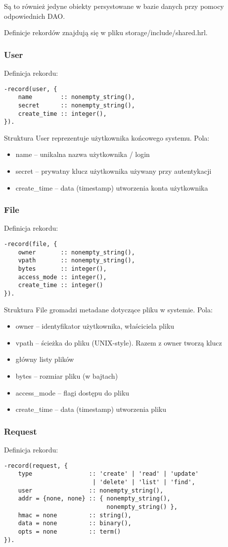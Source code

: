 Są to również jedyne obiekty persystowane w bazie danych przy pomocy odpowiednich DAO.

Definicje rekordów znajdują się w pliku storage/include/shared.hrl.

\subsubsection{User}
Definicja rekordu:
\begin{lstlisting}
-record(user, {
	name 		:: nonempty_string(), 
	secret 		:: nonempty_string(), 
	create_time :: integer(), 
}).
\end{lstlisting}

Struktura User reprezentuje użytkownika końcowego systemu. Pola:
\begin{itemize}
	\item name – unikalna nazwa użytkownika / login
	\item secret – prywatny klucz użytkownika używany przy autentykacji
	\item create\_time – data (timestamp) utworzenia konta użytkownika
\end{itemize}

\subsubsection{File}
Definicja rekordu:
\begin{lstlisting}
-record(file, {
	owner 		:: nonempty_string(), 
	vpath 		:: nonempty_string(), 
	bytes 		:: integer(), 
	access_mode :: integer(), 
	create_time :: integer() 
}).
\end{lstlisting}

Struktura File gromadzi metadane dotyczące pliku w systemie. Pola:
\begin{itemize}
	\item owner – identyfikator użytkownika, właściciela pliku
	\item vpath – ścieżka do pliku (UNIX-style). Razem z owner tworzą klucz \item główny listy plików
	\item bytes – rozmiar pliku (w bajtach)
	\item access\_mode – flagi dostępu do pliku
	\item create\_time – data (timestamp) utworzenia pliku
\end{itemize}

\subsubsection{Request}
Definicja rekordu:
\begin{lstlisting}
-record(request, {
	type 				:: 'create' | 'read' | 'update'
						 | 'delete' | 'list' | 'find',
	user 				:: nonempty_string(),
	addr = {none, none} :: { nonempty_string(),
							 nonempty_string() },
	hmac = none 		:: string(), 
	data = none 		:: binary(), 
	opts = none 		:: term() 
}).
\end{lstlisting}

